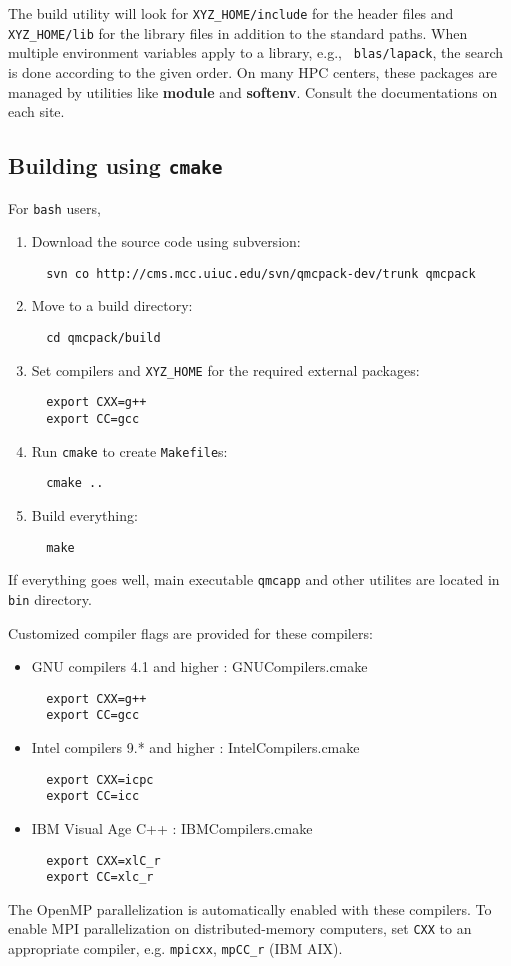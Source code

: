 The build utility \cmake will look for {\tt XYZ\_HOME/include} for the header
files and {\tt XYZ\_HOME/lib} for the library files in addition to the standard
paths.  When multiple environment variables apply to a library, e.g., {\tt
blas/lapack}, the search is done according to the given  order.  On many HPC
centers, these packages are managed by utilities like \textbf{module} and
\textbf{softenv}. Consult the documentations on each site. 

\subsection{Building using {\tt cmake}}\label{cmake.sec}

For {\tt bash} users,
\begin{enumerate}
\item Download the source code using subversion:
\begin{lstlisting}
  svn co http://cms.mcc.uiuc.edu/svn/qmcpack-dev/trunk qmcpack
\end{lstlisting}
\item Move to a build directory:
\begin{lstlisting}
  cd qmcpack/build
\end{lstlisting}
\item Set compilers and {\tt XYZ\_HOME} for the required external packages:
\begin{lstlisting}
  export CXX=g++
  export CC=gcc
\end{lstlisting}
\item Run {\tt cmake} to create \nolinkurl{Makefile}s:
\begin{lstlisting}
  cmake ..
\end{lstlisting}
\item Build everything:
\begin{lstlisting}
  make
\end{lstlisting}
\end{enumerate}

If everything goes well, main executable {\tt qmcapp} and other utilites are
located in {\tt bin} directory. 

Customized compiler flags are provided for these compilers:
\begin{itemize}
\item{}GNU compilers 4.1 and higher : GNUCompilers.cmake 
\begin{lstlisting}
  export CXX=g++
  export CC=gcc
\end{lstlisting}
\item{}Intel compilers 9.* and higher : IntelCompilers.cmake 
\begin{lstlisting}
  export CXX=icpc
  export CC=icc
\end{lstlisting}
\item{}IBM Visual Age C++ : IBMCompilers.cmake
\begin{lstlisting}
  export CXX=xlC_r
  export CC=xlc_r
\end{lstlisting}
\end{itemize}
The OpenMP parallelization is automatically enabled with these compilers. To
enable MPI parallelization on distributed-memory computers, set {\tt CXX} to an
appropriate compiler, e.g. {\tt mpicxx}, {\tt mpCC\_r} (IBM AIX). 
  
